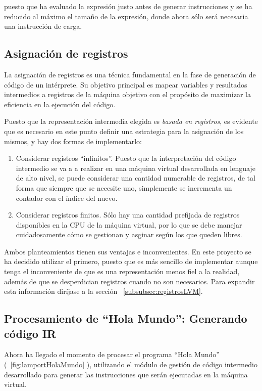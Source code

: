 puesto que ha evaluado la expresión justo antes de generar instrucciones y se ha reducido al máximo el tamaño de la expresión, donde ahora sólo será necesaria una instrucción de carga.

\subsection{Asignación de registros}\label{subsec:asignacionRegIR}
La asignación de registros es una técnica fundamental en la fase de generación de código de un intérprete. Su objetivo principal es mapear variables y resultados intermedios a registros de la máquina objetivo con el propósito de maximizar la eficiencia en la ejecución del código.


Puesto que la representación intermedia elegida es \textit{basada en registros}, es evidente que es necesario en este punto definir una estrategia para la asignación de los mismos, y hay dos formas de implementarlo:

\begin{enumerate}
    \item Considerar registros ``infinitos''. Puesto que la interpretación del código intermedio se va a a realizar en una máquina virtual desarrollada en lenguaje de alto nivel, se puede considerar una cantidad numerable de registros, de tal forma que siempre que se necesite uno, simplemente se incrementa un contador con el índice del nuevo.
    \item Considerar registros finitos. Sólo hay una cantidad prefijada de registros disponibles en la CPU de la máquina virtual, por lo que se debe manejar cuidadosamente cómo se gestionan y asginar según los que queden libres.
\end{enumerate}

Ambos planteamientos tienen sus ventajas e inconvenientes. En este proyecto se ha decidido utilizar el primero, puesto que es más sencillo de implementar aunque tenga el inconveniente de que es una representación menos fiel a la realidad, además de que se desperdician registros cuando no son necesarios. Para expandir esta información diríjase a la sección ~\ref{subsubsec:registrosLVM}.

\subsection{Procesamiento de ``Hola Mundo'': Generando código IR}
Ahora ha llegado el momento de procesar el programa ``Hola Mundo'' (~\ref{fig:lamportHolaMundo} ), utilizando el módulo de gestión de código intermedio desarrollado para generar las instrucciones que serán ejecutadas en la máquina virtual.


